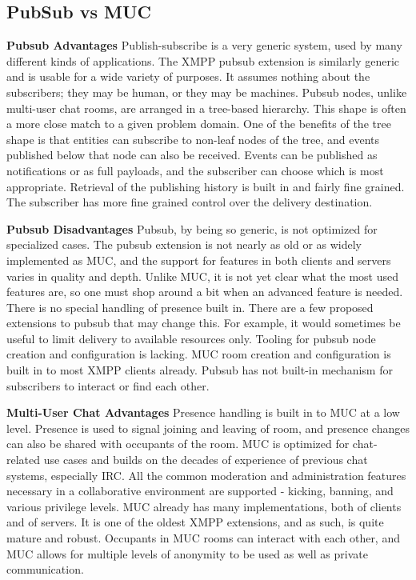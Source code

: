    \subsection{PubSub vs MUC}
	\textbf{Pubsub Advantages}
	\newline
	Publish-subscribe is a very generic system, used by many different kinds of applications. The XMPP pubsub extension is similarly generic and is usable for a wide variety of purposes. It assumes nothing about the subscribers; they may be human, or they may be machines. Pubsub nodes, unlike multi-user chat rooms, are arranged in a tree-based hierarchy. This shape is often a more close match to a given problem domain. One of the benefits of the tree shape is that entities can subscribe to non-leaf nodes of the tree, and events published below that node can also be received. Events can be published as notifications or as full payloads, and the subscriber can choose which is most appropriate. Retrieval of the publishing history is built in and fairly fine grained. The subscriber has more fine grained control over the delivery destination. 

	\textbf{Pubsub Disadvantages}
	\newline
	Pubsub, by being so generic, is not optimized for specialized cases. The pubsub extension is not nearly as old or as widely implemented as MUC, and the support for features in both clients and servers varies in quality and depth. Unlike MUC, it is not yet clear what the most used features are, so one must shop around a bit when an advanced feature is needed. There is no special handling of presence built in. There are a few proposed extensions to pubsub that may change this. For example, it would sometimes be useful to limit delivery to available resources only. Tooling for pubsub node creation and configuration is lacking. MUC room creation and configuration is built in to most XMPP clients already. Pubsub has not built-in mechanism for subscribers to interact or find each other. 

	\textbf{Multi-User Chat Advantages}
	\newline
	Presence handling is built in to MUC at a low level. Presence is used to signal joining and leaving of room, and presence changes can also be shared with occupants of the room. MUC is optimized for chat-related use cases and builds on the decades of experience of previous chat systems, especially IRC. All the common moderation and administration features necessary in a collaborative environment are supported - kicking, banning, and various privilege levels. MUC already has many implementations, both of clients and of servers. It is one of the oldest XMPP extensions, and as such, is quite mature and robust. Occupants in MUC rooms can interact with each other, and MUC allows for multiple levels of anonymity to be used as well as private communication.

